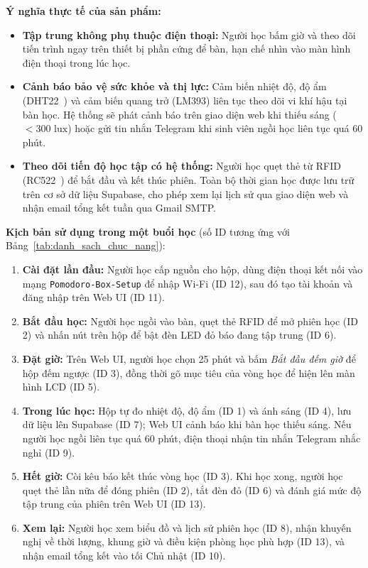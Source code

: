 \textbf{Ý nghĩa thực tế của sản phẩm:}
\begin{itemize}[leftmargin=1.2cm, noitemsep, topsep=2pt]
    \item \textbf{Tập trung không phụ thuộc điện thoại:} Người học bấm giờ và theo dõi tiến trình ngay trên thiết bị phần cứng để bàn, hạn chế nhìn vào màn hình điện thoại trong lúc học.
    \item \textbf{Cảnh báo bảo vệ sức khỏe và thị lực:} Cảm biến nhiệt độ, độ ẩm (DHT22~\cite{dht22}) và cảm biến quang trở (LM393) liên tục theo dõi vi khí hậu tại bàn học. Hệ thống sẽ phát cảnh báo trên giao diện web khi thiếu sáng ($<300\text{ lux}$) hoặc gửi tin nhắn Telegram khi sinh viên ngồi học liên tục quá 60 phút.
    \item \textbf{Theo dõi tiến độ học tập có hệ thống:} Người học quẹt thẻ từ RFID (RC522~\cite{mfrc522}) để bắt đầu và kết thúc phiên. Toàn bộ thời gian học được lưu trữ trên cơ sở dữ liệu Supabase, cho phép xem lại lịch sử qua giao diện web và nhận email tổng kết tuần qua Gmail SMTP.
\end{itemize}

\textbf{Kịch bản sử dụng trong một buổi học} (số ID tương ứng với Bảng~\ref{tab:danh_sach_chuc_nang}):
\begin{enumerate}[leftmargin=1.2cm, noitemsep, topsep=2pt]
    \item \textbf{Cài đặt lần đầu:} Người học cấp nguồn cho hộp, dùng điện thoại kết nối vào mạng \texttt{Pomodoro-Box-Setup} để nhập Wi-Fi (ID 12), sau đó tạo tài khoản và đăng nhập trên Web UI (ID 11).
    \item \textbf{Bắt đầu học:} Người học ngồi vào bàn, quẹt thẻ RFID để mở phiên học (ID 2) và nhấn nút trên hộp để bật đèn LED đỏ báo đang tập trung (ID 6).
    \item \textbf{Đặt giờ:} Trên Web UI, người học chọn 25 phút và bấm \textit{Bắt đầu đếm giờ} để hộp đếm ngược (ID 3), đồng thời gõ mục tiêu của vòng học để hiện lên màn hình LCD (ID 5).
    \item \textbf{Trong lúc học:} Hộp tự đo nhiệt độ, độ ẩm (ID 1) và ánh sáng (ID 4), lưu dữ liệu lên Supabase (ID 7); Web UI cảnh báo khi bàn học thiếu sáng. Nếu người học ngồi liên tục quá 60 phút, điện thoại nhận tin nhắn Telegram nhắc nghỉ (ID 9).
    \item \textbf{Hết giờ:} Còi kêu báo kết thúc vòng học (ID 3). Khi học xong, người học quẹt thẻ lần nữa để đóng phiên (ID 2), tắt đèn đỏ (ID 6) và đánh giá mức độ tập trung của phiên trên Web UI (ID 13).
    \item \textbf{Xem lại:} Người học xem biểu đồ và lịch sử phiên học (ID 8), nhận khuyến nghị về thời lượng, khung giờ và điều kiện phòng học phù hợp (ID 13), và nhận email tổng kết vào tối Chủ nhật (ID 10).
\end{enumerate}

